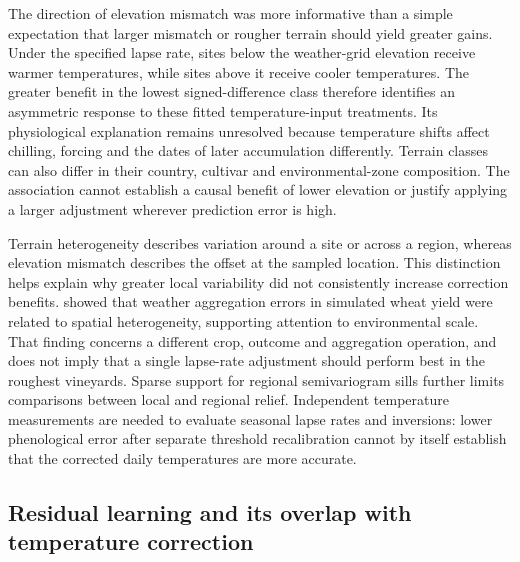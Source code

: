 \documentclass[a4paper,12pt]{article}
\let\OriginalSubsection\subsection
\renewcommand{\subsection}{\FloatBarrier\OriginalSubsection}
\begin{document}
The direction of elevation mismatch was more informative than a simple expectation that larger mismatch or rougher terrain should yield greater gains. Under the specified lapse rate, sites below the weather-grid elevation receive warmer temperatures, while sites above it receive cooler temperatures. The greater benefit in the lowest signed-difference class therefore identifies an asymmetric response to these fitted temperature-input treatments. Its physiological explanation remains unresolved because temperature shifts affect chilling, forcing and the dates of later accumulation differently. Terrain classes can also differ in their country, cultivar and environmental-zone composition. The association cannot establish a causal benefit of lower elevation or justify applying a larger adjustment wherever prediction error is high.

Terrain heterogeneity describes variation around a site or across a region, whereas elevation mismatch describes the offset at the sampled location. This distinction helps explain why greater local variability did not consistently increase correction benefits. \citet{zhaoDemand2015} showed that weather aggregation errors in simulated wheat yield were related to spatial heterogeneity, supporting attention to environmental scale. That finding concerns a different crop, outcome and aggregation operation, and does not imply that a single lapse-rate adjustment should perform best in the roughest vineyards. Sparse support for regional semivariogram sills further limits comparisons between local and regional relief. Independent temperature measurements are needed to evaluate seasonal lapse rates and inversions: lower phenological error after separate threshold recalibration cannot by itself establish that the corrected daily temperatures are more accurate.

\subsection{Residual learning and its overlap with temperature correction}
\end{document}
